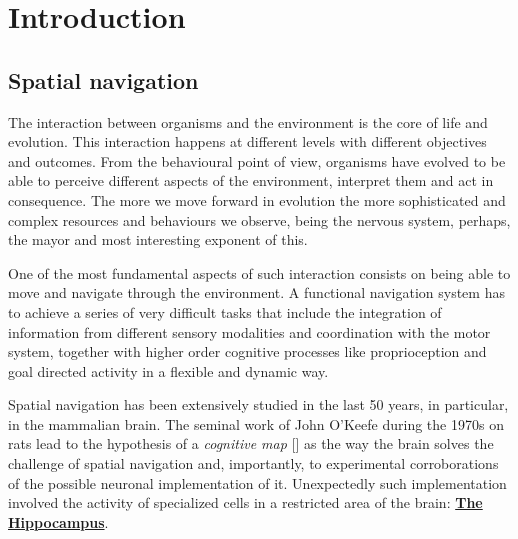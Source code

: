 
\chapter{Introduction} %

\label{Chapter1} %





\section{Spatial navigation}
\label{chap1:sec1:spatial_navigation}

The interaction between organisms and the environment is the core of life and evolution. This interaction happens at different levels with different objectives and outcomes. 
From the behavioural point of view, organisms have evolved to be able to perceive different aspects of the environment, interpret them and act in consequence. 
The more we move forward in evolution the more sophisticated and complex resources and behaviours we observe, being the nervous system, perhaps, the mayor and most interesting exponent of this. 

One of the most fundamental aspects of such interaction consists on being able to move and navigate through the environment.
A functional navigation system has to achieve a series of very difficult tasks that include the integration of information from different sensory modalities and coordination with the motor system, together with higher order cognitive processes like proprioception and goal directed activity in a flexible and dynamic way.

Spatial navigation has been extensively studied in the last 50 years, in particular, in the mammalian brain. 
The seminal work of John O'Keefe during the 1970s on rats lead to the hypothesis of a \textit{cognitive map} [\cite{okeefebook}] as the way the brain solves the challenge of spatial navigation and, importantly, to experimental corroborations of the possible neuronal implementation of it. 
Unexpectedly such implementation involved the activity of specialized cells in a restricted area of the brain: \hyperref[chap1:sec:1:subsec1:hippocampus]{\textbf{The Hippocampus}}.

